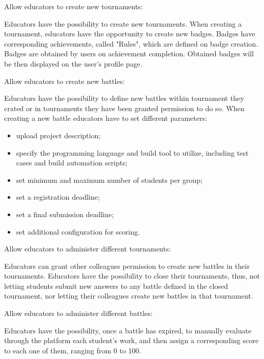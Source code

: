 \documentclass{article}
\begin{document}
\begin{description}
    \item[G1:] Allow educators to create new tournaments:
        \item Educators have the possibility to create new tournaments. 
            When creating a tournament, educators have the opportunity to create new badges. Badges have corresponding achievements, called "Rules", which are defined on badge creation. Badges are obtained by users on achievement completion. Obtained badges will be then displayed on the user's profile page.
    \item[G2:] Allow educators to create new battles:
            \item Educators have the possibility to define new battles within tournament they crated or in tournaments they have been granted permission to do so. When creating a new battle educators have to set different parameters:
            \begin{itemize}
                \item upload project description;
                \item specify the programming language and build tool to utilize, including test cases and build automation scripts;
                \item set minimum and maximum number of students per group;
                \item set a registration deadline;
                \item set a final submission deadline;
                \item set additional configuration for scoring.
            \end{itemize}
    \item[G3:] Allow educators to administer different tournaments:
        \item Educators can grant other colleagues permission to create new battles in their tournaments. Educators have the possibility to close their tournaments, thus, not letting students submit new answers to any battle defined in the closed tournament, nor letting their colleagues create new battles in that tournament. 
    \item[G4:] Allow educators to administer different battles:
        \item Educators have the possibility, once a battle has expired, to manually evaluate through the platform each student's work, and then assign a corresponding score to each one of them, ranging from 0 to 100. 

\end{description}
\end{document}
